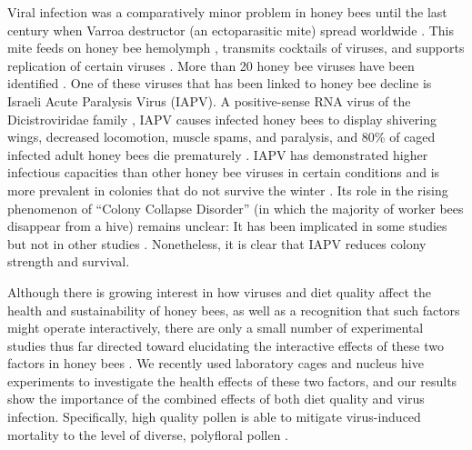 \documentclass{bmcart}
\begin{document}
\begin{linenumbers}
\begin{doublespacing}
Viral infection was a comparatively minor problem in honey bees until the last century when Varroa destructor (an ectoparasitic mite) spread worldwide \cite{miteSpread}. This mite feeds on honey bee hemolymph \cite{hemolymph}, transmits cocktails of viruses, and supports replication of certain viruses \cite{miteVirus, miteVirus2, miteVirus3}. More than 20 honey bee viruses have been identified \cite{numVirus}. One of these viruses that has been linked to honey bee decline is Israeli Acute Paralysis Virus (IAPV). A positive-sense RNA virus of the Dicistroviridae family \cite{fam}, IAPV causes infected honey bees to display shivering wings, decreased locomotion, muscle spams, and paralysis, and 80\% of caged infected adult honey bees die prematurely \cite{symptoms}. IAPV has demonstrated higher infectious capacities than other honey bee viruses in certain conditions \cite{carrillo} and is more prevalent in colonies that do not survive the winter \cite{winter}. Its role in the rising phenomenon of ``Colony Collapse Disorder'' (in which the majority of worker bees disappear from a hive) remains unclear: It has been implicated in some studies \cite{iapvCCD, iapvCCD2} but not in other studies \cite{ccd1, fam, iapvCCD3}. Nonetheless, it is clear that IAPV reduces colony strength and survival.

Although there is growing interest in how viruses and diet quality affect the health and sustainability of honey bees, as well as a recognition that such factors might operate interactively, there are only a small number of experimental studies thus far directed toward elucidating the interactive effects of these two factors in honey bees \cite{intNV, intNV2, intNV3}. We recently used laboratory cages and nucleus hive experiments to investigate the health effects of these two factors, and our results show the importance of the combined effects of both diet quality and virus infection. Specifically, high quality pollen is able to mitigate virus-induced mortality to the level of diverse, polyfloral pollen \cite{adamInt}. 


\end{doublespacing}
\end{linenumbers}
\end{document}
